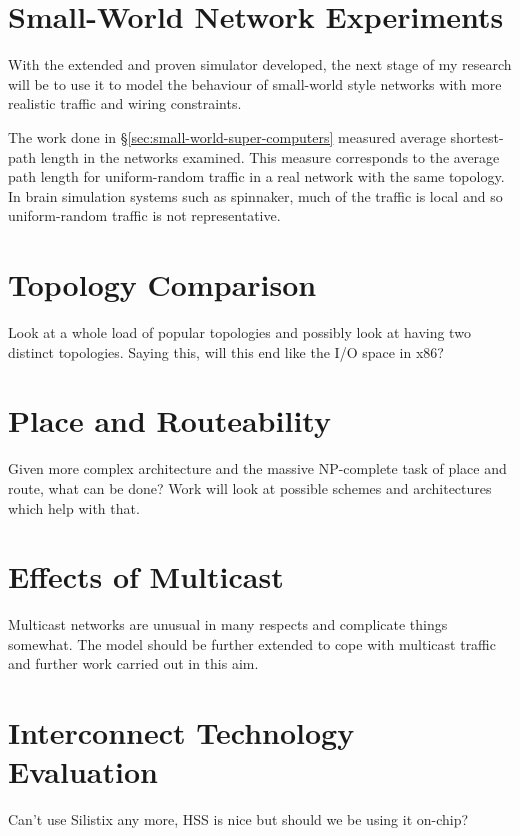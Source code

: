 	
	\section{Small-World Network Experiments}
		
		With the extended and proven simulator developed, the next stage of my
		research will be to use it to model the behaviour of small-world style
		networks with more realistic traffic and wiring constraints.
		
		The work done in \S\ref{sec:small-world-super-computers} measured average
		shortest-path length in the networks examined. This measure corresponds to
		the average path length for uniform-random traffic in a real network with
		the same topology. In brain simulation systems such as spinnaker, much of
		the traffic is local and so uniform-random traffic is not representative.
	
	
	\section{Topology Comparison}
		
		Look at a whole load of popular topologies and possibly look at having two
		distinct topologies. Saying this, will this end like the I/O space in x86?
	
	\section{Place and Routeability}
		
		Given more complex architecture and the massive NP-complete task of place
		and route, what can be done? Work will look at possible schemes and
		architectures which help with that.
	
	\section{Effects of Multicast}
		
		Multicast networks are unusual in many respects and complicate things
		somewhat. The model should be further extended to cope with multicast
		traffic and further work carried out in this aim.
	
	\section{Interconnect Technology Evaluation}
		
		Can't use Silistix any more, HSS is nice but should we be using it on-chip?
	
